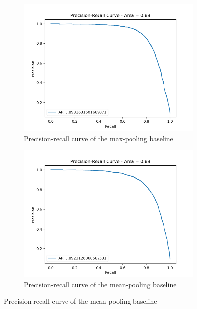 \documentclass[11pt,a4paper]{article}
\begin{document}
\begin{figure}
     \caption{The test set precision-recall curves of our models}
     \label{fig:curves}
     \centering
     \begin{subfigure}[b]{0.5\textwidth}
         \centering
         \includegraphics[width=\textwidth]{images/baseline_max_pooling.png}
         \caption{Precision-recall curve of the max-pooling baseline}
         \label{fig:max_pooling}
     \end{subfigure}
     \hfill
     \begin{subfigure}[b]{0.5\textwidth}
         \centering
         \includegraphics[width=\textwidth]{images/baseline_mean_pooling.png}
         \caption{Precision-recall curve of the mean-pooling baseline}
         \label{fig:mean_pooling}
     \end{subfigure}
\end{figure}
\end{document}
